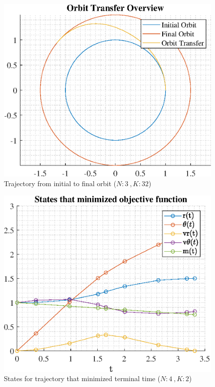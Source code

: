\documentclass[]{article}
\begin{document}
\begin{figure}
	\centering
	\includegraphics[scale=0.75]{orbit_N3_K32_C2_tf.eps}
	\caption{Trajectory from initial to final orbit (\(N:3\ , K:32\))}
	\label{fig:orbit_N3_K32_C2_tf}
\end{figure}
\begin{figure}
	\centering
	\includegraphics[scale=0.75]{states_N4_K2_C2_tf.eps}
	\caption{States for trajectory that minimized terminal time (\(N:4\ , K:2\))}
	\label{fig:states_N4_K2_C2_tf}
\end{figure}
\end{document}
